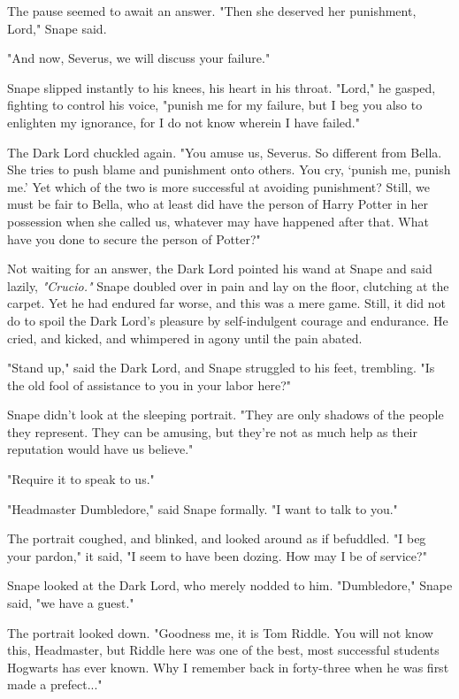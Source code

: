 \documentclass[a4paper,11pt]{article}
\begin{document}
The pause seemed to await an answer. "Then she deserved her punishment, Lord," Snape said.

"And now, Severus, we will discuss your failure."

Snape slipped instantly to his knees, his heart in his throat. "Lord," he gasped, fighting to control his voice, "punish me for my failure, but I beg you also to enlighten my ignorance, for I do not know wherein I have failed."

The Dark Lord chuckled again. "You amuse us, Severus. So different from Bella. She tries to push blame and punishment onto others. You cry, `punish me, punish me.' Yet which of the two is more successful at avoiding punishment? Still, we must be fair to Bella, who at least did have the person of Harry Potter in her possession when she called us, whatever may have happened after that. What have you done to secure the person of Potter?"

Not waiting for an answer, the Dark Lord pointed his wand at Snape and said lazily, \emph{"Crucio."} Snape doubled over in pain and lay on the floor, clutching at the carpet. Yet he had endured far worse, and this was a mere game. Still, it did not do to spoil the Dark Lord's pleasure by self-indulgent courage and endurance. He cried, and kicked, and whimpered in agony until the pain abated.

"Stand up," said the Dark Lord, and Snape struggled to his feet, trembling. "Is the old fool of assistance to you in your labor here?"

Snape didn't look at the sleeping portrait. "They are only shadows of the people they represent. They can be amusing, but they're not as much help as their reputation would have us believe."

"Require it to speak to us."

"Headmaster Dumbledore," said Snape formally. "I want to talk to you."

The portrait coughed, and blinked, and looked around as if befuddled. "I beg your pardon," it said, "I seem to have been dozing. How may I be of service?"

Snape looked at the Dark Lord, who merely nodded to him. "Dumbledore," Snape said, "we have a guest."

The portrait looked down. "Goodness me, it is Tom Riddle. You will not know this, Headmaster, but Riddle here was one of the best, most successful students Hogwarts has ever known. Why I remember back in forty-three when he was first made a prefect..."
\end{document}
